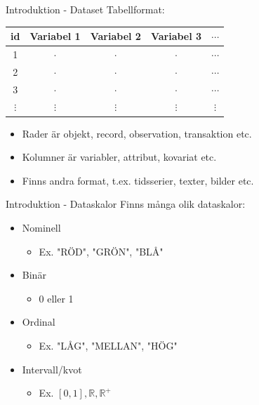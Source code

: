 \documentclass[10pt,english]{beamer}
\begin{document}
\begin{frame}{Introduktion - Dataset}
    Tabellformat:\\
    \begin{tabular}{|c|c|c|c|c|}
        \hline
        id & Variabel 1 & Variabel 2 & Variabel 3 &  $\cdots$ \\ \hline \hline
        1 & $\cdot$ & $\cdot$ & $\cdot$ & $\cdots$ \\ \hline
        2 & $\cdot$ & $\cdot$ & $\cdot$ & $\cdots$ \\ \hline
        3 & $\cdot$ & $\cdot$ & $\cdot$ & $\cdots$ \\ \hline
        $\vdots$ & $\vdots$ & $\vdots$ & $\vdots$ & $\vdots$ \\ \hline
    \end{tabular}
    \begin{itemize}
        \item Rader är objekt, record, observation, transaktion etc.
        \item Kolumner är variabler, attribut, kovariat etc.
        \item Finns andra format, t.ex. tidsserier, texter, bilder etc.
    \end{itemize}
\end{frame}

\begin{frame}{Introduktion - Dataskalor}
    Finns många olik dataskalor:
    \begin{itemize}
        \item Nominell
        \begin{itemize}
            \item Ex. "RÖD", "GRÖN", "BLÅ"
        \end{itemize}
        \item Binär
        \begin{itemize}
            \item 0 eller 1
        \end{itemize}
        \item Ordinal
        \begin{itemize}
            \item Ex. "LÅG", "MELLAN", "HÖG"
        \end{itemize}
        \item Intervall/kvot
        \begin{itemize}
            \item Ex. $[0,1], \mathbb{R}, \mathbb{R}^{+}$
        \end{itemize}
    \end{itemize}
\end{frame}
\end{document}
